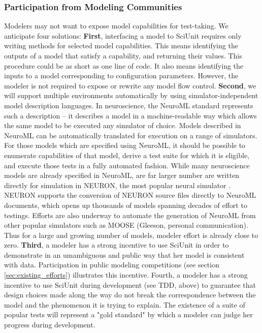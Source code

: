 \documentclass[11pt,letterpaper]{article}
\begin{document}
\subsubsection{Participation from Modeling Communities}
Modelers may not want to expose model capabilities for test-taking.  We anticipate four solutions: \textbf{First}, interfacing a model to SciUnit requires only writing methods for selected model capabilities.  This means identifying the outputs of a model that satisfy a capability, and returning their values.  This procedure could be as short as one line of code.  It also means identifying the inputs to a model corresponding to configuration parameters.  However, the modeler is not required to expose or rewrite any model flow control.  \textbf{Second}, we will support multiple environments automatically by using simulator-independent model description languages. In neuroscience, the NeuroML standard represents such a description \cite{gleeson_neuroml:_2010} -- it describes a model in a machine-readable way which allows the same model to be executed any simulator of choice.  Models described in NeuroML can be automatically translated for execution on a range of simulators.  For those models which are specified using NeuroML, it should be possible to enumerate capabilities of that model, derive a test suite for which it is eligible, and execute those tests in a fully automated fashion.  While many neuroscience models are already specified in NeuroML, are far larger number are written directly for simulation in NEURON, the most popular neural simulator \cite{neuron_url,carnevale_neuron_2006}.  NEURON supports the conversion of NEURON source files directly to NeuroML documents, which opens up thousands of models spanning decades of effort to testings.  Efforts are also underway to automate the generation of NeuroML from other popular simulators such as MOOSE (Gleeson, personal communication).  Thus for a large and growing number of models, modeler effort is already close to zero.  \textbf{Third}, a modeler has a strong incentive to use SciUnit in order to demonstrate in an umambiguous and public way that her model is consistent with data.  Participation in public modeling competitions (see section \ref{sec:existing_efforts}) illustrates this incentive.  Fourth, a modeler has a strong incentive to use SciUnit during development (see TDD, above) to guarantee that design choices made along the way do not break the correspondence between the model and the phenomenon it is trying to explain.  The existence of a suite of popular tests will represent a "gold standard" by which a modeler can judge her progress during development.
\end{document}

